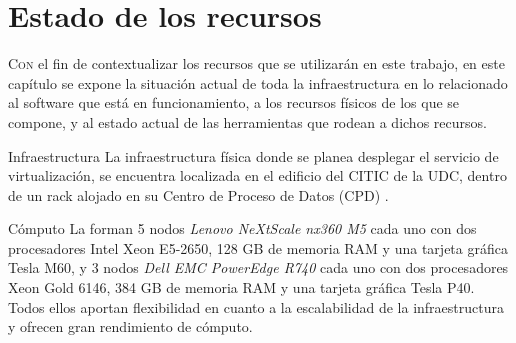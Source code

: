 \chapter{Estado de los recursos}
\label{chap:estadoInfraestructuraSistema}

\lettrine{C}{on} el fin de contextualizar los recursos que se utilizarán en este trabajo, en este capítulo se expone la situación actual de toda la infraestructura en lo relacionado al software que está en funcionamiento, a los recursos físicos de los que se compone, y al estado actual de las herramientas que rodean a dichos recursos.

\begin{section}{Infraestructura}
La infraestructura física donde se planea desplegar el servicio de virtualización, se encuentra localizada en el edificio del CITIC de la UDC, dentro de un rack alojado en su Centro de Proceso de Datos (CPD) \cite{citicUDC}. 
\begin{subsection}{Cómputo}
    La forman 5 nodos \textit{Lenovo NeXtScale nx360 M5} cada uno con dos procesadores Intel Xeon E5-2650, 128 GB de memoria RAM y una tarjeta gráfica Tesla M60,  y 3 nodos \textit{Dell EMC PowerEdge R740} cada uno con dos procesadores Xeon Gold 6146, 384 GB de memoria RAM y una tarjeta gráfica Tesla P40. Todos ellos aportan flexibilidad en cuanto a la escalabilidad de la infraestructura y ofrecen gran rendimiento de cómputo.
\end{subsection}

\end{section}
